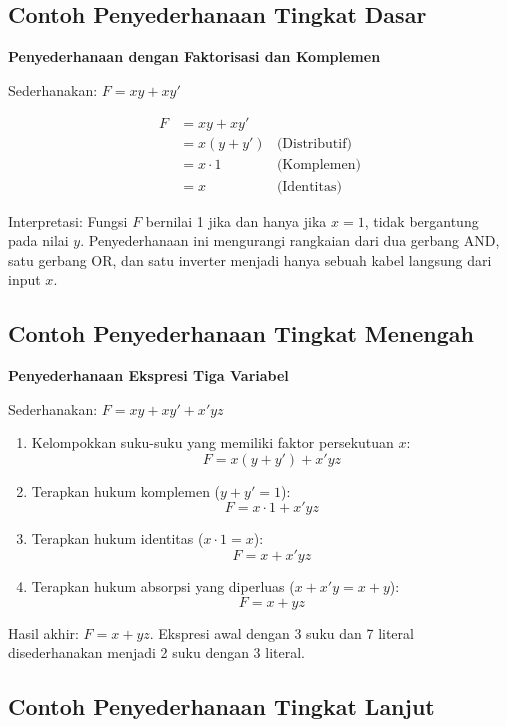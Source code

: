\subsection{Contoh Penyederhanaan Tingkat Dasar}

\begin{contoh}
\textbf{Penyederhanaan dengan Faktorisasi dan Komplemen}

Sederhanakan: $F = xy + xy'$

\begin{align*}
F &= xy + xy' \\
  &= x(y + y') & \text{(Distributif)} \\
  &= x \cdot 1 & \text{(Komplemen)} \\
  &= x & \text{(Identitas)}
\end{align*}

Interpretasi: Fungsi $F$ bernilai 1 jika dan hanya jika $x = 1$, tidak bergantung pada nilai $y$. Penyederhanaan ini mengurangi rangkaian dari dua gerbang AND, satu gerbang OR, dan satu inverter menjadi hanya sebuah kabel langsung dari input $x$.
\end{contoh}

\subsection{Contoh Penyederhanaan Tingkat Menengah}

\begin{contoh}
\textbf{Penyederhanaan Ekspresi Tiga Variabel}

Sederhanakan: $F = xy + xy' + x'yz$

\begin{enumerate}
    \item Kelompokkan suku-suku yang memiliki faktor persekutuan $x$:
    \[ F = x(y + y') + x'yz \]
    \item Terapkan hukum komplemen ($y + y' = 1$):
    \[ F = x \cdot 1 + x'yz \]
    \item Terapkan hukum identitas ($x \cdot 1 = x$):
    \[ F = x + x'yz \]
    \item Terapkan hukum absorpsi yang diperluas ($x + x'y = x + y$):
    \[ F = x + yz \]
\end{enumerate}

Hasil akhir: $F = x + yz$. Ekspresi awal dengan 3 suku dan 7 literal disederhanakan menjadi 2 suku dengan 3 literal.
\end{contoh}

\subsection{Contoh Penyederhanaan Tingkat Lanjut}

